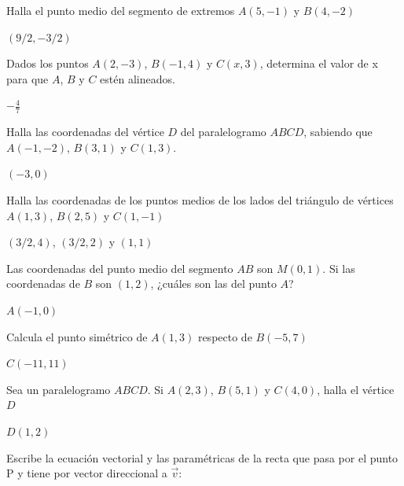 \documentclass[spanish, 11pt]{exam}
\begin{document}
\begin{questions}
\question Halla el punto medio del segmento de extremos $A(5, -1)$ y $B(4, -2)$ 
\begin{solution} $(9/2, -3/2)$\end{solution}

\question Dados los puntos $A(2, -3)$, $B(-1, 4)$ y $C(x, 3)$, determina el valor de x para que $A$, $B$ y $C$ estén alineados.
\begin{solution} $ -\frac{4}{7}$\end{solution}

\question Halla las coordenadas del vértice $D$ del paralelogramo $ABCD$, sabiendo que $A(-1, -2)$, $B(3, 1)$ y $C(1, 3)$.
\begin{solution} $(-3,0)$\end{solution}


\question Halla las coordenadas de los puntos medios de los lados del
triángulo de vértices $A(1,3)$, $B(2,5)$ y $C(1,-1)$
\begin{solution} $(3/2,4)$, $(3/2,2)$ y $(1,1)$ \end{solution}

\question Las coordenadas del punto medio del segmento $AB$ son $M(0,1)$. Si las coordenadas de $B$ son $(1,2)$, ¿cuáles son las del punto $A$?
\begin{solution} $A(-1,0)$ \end{solution}

\question Calcula el punto simétrico de $A(1,3)$ respecto de $B(-5,7)$ 
\begin{solution} $C(-11,11)$ \end{solution}

\question Sea un paralelogramo $ABCD$. Si $A(2,3)$, $B(5,1)$ y $C(4,0)$, halla
el vértice $D$
\begin{solution} $D(1,2)$ \end{solution}

\question Escribe la ecuación vectorial y las paramétricas de la recta que pasa por el punto P y tiene por vector direccional a $\overrightarrow{v}$:
\begin{multicols}{2}
\end{multicols}
\end{questions}
\end{document}
